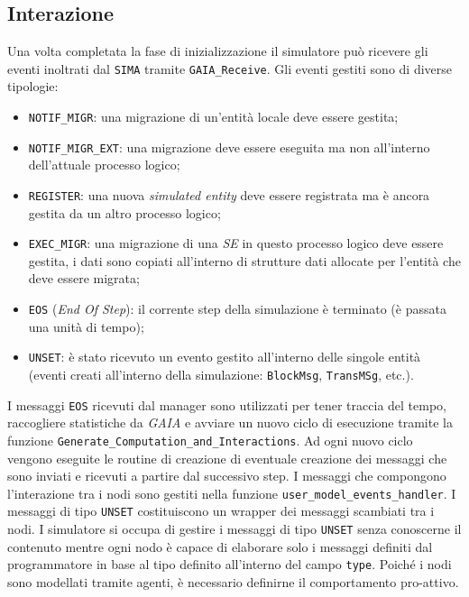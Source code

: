 \begin{code}
\section{Interazione}
Una volta completata la fase di inizializzazione il simulatore può ricevere gli eventi inoltrati dal \texttt{SIMA} tramite \texttt{GAIA\_Receive}. Gli eventi gestiti sono di diverse tipologie:
\begin{itemize}
    \item \texttt{NOTIF\_MIGR}: una migrazione di un'entità locale deve essere gestita;
    \item \texttt{NOTIF\_MIGR\_EXT}: una migrazione deve essere eseguita ma non all'interno dell'attuale processo logico;
    \item \texttt{REGISTER}: una nuova \textit{simulated entity} deve essere registrata ma è ancora gestita da un altro processo logico;
    \item \texttt{EXEC\_MIGR}: una migrazione di una \textit{SE} in questo processo logico deve essere gestita, i dati sono copiati all'interno di strutture dati allocate per l'entità che deve essere migrata;
    \item \texttt{EOS} (\textit{End Of Step}): il corrente step della simulazione è terminato (è passata una unità di tempo);
    \item \texttt{UNSET}: è stato ricevuto un evento gestito all'interno delle singole entità (eventi creati all'interno della simulazione: \texttt{BlockMsg}, \texttt{TransMSg}, etc.).
\end{itemize}
I messaggi \texttt{EOS} ricevuti dal manager sono utilizzati per tener traccia del tempo, raccogliere statistiche da \textit{GAIA} e avviare un nuovo ciclo di esecuzione tramite la funzione \texttt{Generate\_Computation\_and\_Interactions}. Ad ogni nuovo ciclo vengono eseguite le routine di creazione di eventuale creazione dei messaggi che sono inviati e ricevuti a partire dal successivo step.\newline
I messaggi che compongono l'interazione tra i nodi sono gestiti nella funzione \texttt{user\_model\_events\_handler}. I messaggi di tipo \texttt{UNSET} costituiscono un wrapper dei messaggi scambiati tra i nodi. I simulatore si occupa di gestire i messaggi di tipo \texttt{UNSET} senza conoscerne il contenuto mentre ogni nodo è capace di elaborare solo i messaggi definiti dal programmatore in base al tipo definito all'interno del campo \texttt{type}.\newline
Poiché i nodi sono modellati tramite agenti, è necessario definirne il comportamento pro-attivo.\newline

\end{code}
